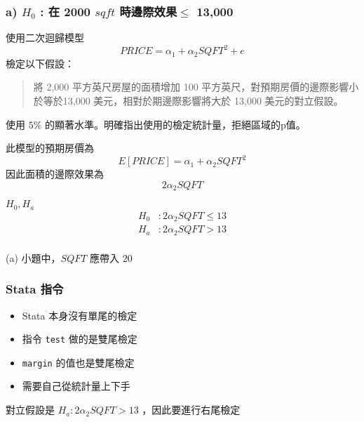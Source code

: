 \begin{frame}
    \frametitle{a) $H_0$ : 在 2000 $sqft$ 時邊際效果$\le $ 13,000 }

    使用二次迴歸模型 
    \begin{equation*}
        PRICE = \alpha_1 + \alpha_2 SQFT^2 + e
    \end{equation*}
    檢定以下假設：

    \begin{quote}
    將 2,000 平方英尺房屋的面積增加 100 平方英尺，對預期房價的邊際影響小於等於13,000 美元，相對於期邊際影響將大於 13,000 美元的對立假設。
    \end{quote}
    使用 $5\%$ 的顯著水準。明確指出使用的檢定統計量，拒絕區域的p值。
\end{frame}

\begin{frame}[plain]
    此模型的預期房價為 
    \begin{equation*}
        E[PRICE] = \alpha_1 + \alpha_2 SQFT^2
    \end{equation*}
    因此面積的邊際效果為
    \begin{equation}
        2\alpha_2 SQFT
    \end{equation}
    \begin{block}{$H_0, H_a$}
        \begin{align*}
            H_0 &: 2\alpha_2 SQFT \le 13 \\
            H_a &: 2\alpha_2 SQFT > 13 \\
        \end{align*}
    \end{block}

    (a) 小題中，$SQFT$ 應帶入 20
\end{frame}

\begin{frame}
    \frametitle{Stata 指令}
    \begin{itemize}
        \item Stata 本身沒有單尾的檢定
        \item 指令 \texttt{test} 做的是雙尾檢定
        \item \texttt{margin} 的值也是雙尾檢定
        \item 需要自己從統計量上下手
    \end{itemize}

    對立假設是 $H_a : 2\alpha_2 SQFT > 13$ ，因此要進行右尾檢定
\end{frame}

